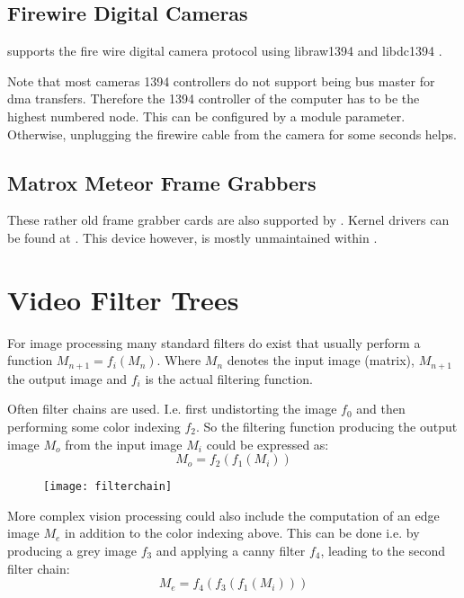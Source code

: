 \subsection{Firewire Digital Cameras}

\miro supports the fire wire digital camera protocol using
libraw1394\cite{} and libdc1394 \cite{}.
  
Note that most cameras 1394 controllers do not support being bus
master for dma transfers. Therefore the 1394 controller of the
computer has to be the highest numbered node. This can be configured
by a module parameter. Otherwise, unplugging the firewire cable from
the camera for some seconds helps.

\subsection{Matrox Meteor Frame Grabbers}

These rather old frame grabber cards are also supported by \miro.
Kernel drivers can be found at \cite{}. This device however, is mostly
unmaintained within \miro.

\section{Video Filter Trees}

For image processing many standard filters do exist that usually
perform a function $M_{n+1} = f_i(M_{n})$. Where $M_n$ denotes the input
image (matrix), $M_{n+1}$ the output image and $f_i$ is the actual
filtering function. 

Often filter chains are used. I.e. first undistorting
the image $f_0$ and then performing some color indexing $f_2$. So the
filtering function producing the output image $M_o$ from the input
image $M_i$ could be expressed as:  $$M_o = f_2(f_1(M_i))$$

\begin{figure}[!ht]
  \begin{center}
    \texttt{[image: filterchain]}
  \end{center}
\end{figure}

More complex vision processing could also include the computation of
an edge image $M_e$ in addition to the color indexing above. This can
be done i.e. by producing a grey image $f_3$ and applying a canny
filter $f_4$, leading to the second filter chain: 
$$M_e = f_4(f_3(f_1(M_i)))$$

